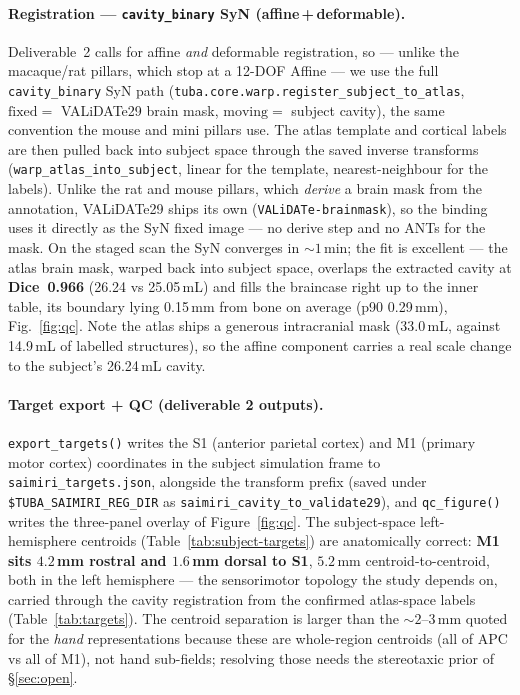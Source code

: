 \documentclass{compactarticle}
\begin{document}
\paragraph{Registration --- \texttt{cavity\_binary} SyN
(affine\,+\,deformable).}
Deliverable~2 calls for affine \emph{and} deformable registration, so
--- unlike the macaque/rat pillars, which stop at a 12-DOF Affine --- we
use the full \texttt{cavity\_binary} SyN path
(\texttt{tuba.core.warp.\allowbreak register\_subject\_to\_atlas},
$\mathrm{fixed}=$ VALiDATe29 brain mask, $\mathrm{moving}=$ subject
cavity), the same convention the mouse and mini pillars use. The atlas
template and cortical labels are then pulled back into subject space
through the saved inverse transforms
(\texttt{warp\_atlas\_into\_subject}, linear for the template,
nearest-neighbour for the labels). Unlike the rat and mouse pillars,
which \emph{derive} a brain mask from the annotation, VALiDATe29 ships
its own (\texttt{VALiDATe-brainmask}), so the binding uses it directly
as the SyN fixed image --- no derive step and no ANTs for the mask. On
the staged scan the SyN converges in ${\sim}1$\,min; the fit is
excellent --- the atlas brain mask, warped back into subject space,
overlaps the extracted cavity at \textbf{Dice~0.966}
(26.24 vs 25.05\,mL) and fills the braincase right up to the inner table,
its boundary lying 0.15\,mm from bone on average (p90 0.29\,mm),
Fig.~\ref{fig:qc}. Note the atlas ships a generous intracranial mask
(33.0\,mL, against 14.9\,mL of labelled structures), so the affine
component carries a real scale change to the subject's 26.24\,mL
cavity.

\paragraph{Target export + QC (deliverable 2 outputs).}
\texttt{export\_targets()} writes the S1 (anterior parietal cortex) and
M1 (primary motor cortex) coordinates in the subject simulation frame to
\texttt{saimiri\_targets.json}, alongside the transform prefix (saved
under \texttt{\$TUBA\_SAIMIRI\_REG\_DIR} as
\texttt{saimiri\_cavity\_to\_validate29}), and \texttt{qc\_figure()}
writes the three-panel overlay of Figure~\ref{fig:qc}. The subject-space
left-hemisphere centroids (Table~\ref{tab:subject-targets}) are
anatomically correct: \textbf{M1 sits $4.2$\,mm rostral and $1.6$\,mm
dorsal to S1}, $5.2$\,mm centroid-to-centroid, both in the left
hemisphere --- the sensorimotor topology the study depends on, carried
through the cavity registration from the confirmed atlas-space labels
(Table~\ref{tab:targets}). The centroid separation is larger than the
${\sim}2$--3\,mm quoted for the \emph{hand} representations because
these are whole-region centroids (all of APC vs all of M1), not hand
sub-fields; resolving those needs the stereotaxic prior of
\S\ref{sec:open}.
\end{document}
